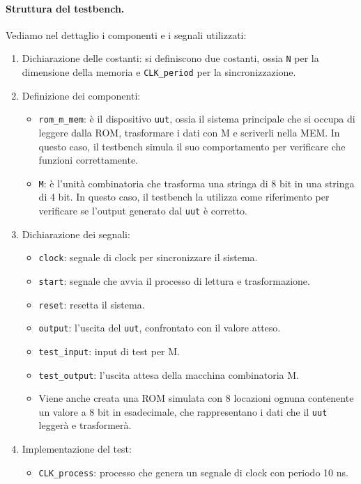 \paragraph{Struttura del testbench.}
Vediamo nel dettaglio i componenti e i segnali utilizzati:
\begin{enumerate}
    \item Dichiarazione delle costanti: si definiscono due costanti, ossia \texttt{N} per la dimensione della memoria e \texttt{CLK\_period} per la sincronizzazione.
    \item Definizione dei componenti:
    \begin{itemize}
        \item \texttt{rom\_m\_mem}: è il dispositivo \texttt{uut}, ossia il sistema principale che si occupa di leggere dalla ROM, trasformare i dati con M e scriverli nella MEM. In questo caso, il testbench simula il suo comportamento per verificare che funzioni correttamente.
        \item \texttt{M}: è l'unità combinatoria che trasforma una stringa di 8 bit in una stringa di 4 bit. In questo caso, il testbench la utilizza come riferimento per verificare se l'output generato dal \texttt{uut} è corretto.
    \end{itemize}
    \item Dichiarazione dei segnali:
    \begin{itemize}
        \item \texttt{clock}: segnale di clock per sincronizzare il sistema.
        \item \texttt{start}: segnale che avvia il processo di lettura e trasformazione.
        \item \texttt{reset}: resetta il sistema.
        \item \texttt{output}: l’uscita del \texttt{uut}, confrontato con il valore atteso.
        \item \texttt{test\_input}: input di test per M.
        \item \texttt{test\_output}: l’uscita attesa della macchina combinatoria M.
        \item Viene anche creata una ROM simulata con 8 locazioni ognuna contenente un valore a 8 bit in esadecimale, che rappresentano i dati che il \texttt{uut} leggerà e trasformerà.
    \end{itemize}
    \item Implementazione del test:
    \begin{itemize}
        \item \texttt{CLK\_process}: processo che genera un segnale di clock con periodo 10 ns.

\end{itemize}
\end{enumerate}

